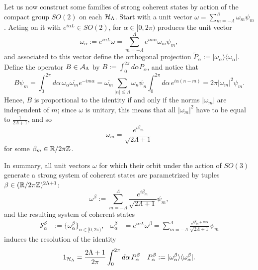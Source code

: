 Let us now construct some families of strong coherent states by action of the compact group $SO(2)$ on each $\mathcal H_\Lambda$. Start with a unit vector $\omega = \sum_{m = -\Lambda}^\Lambda \omega_m \psi_m$. Acting on it with $e^{i \alpha L } \in  SO(2)$, for $\alpha \in [0, 2\pi)$
produces the unit vector
\begin{equation}
    \omega_\alpha := e^{i \alpha L} \omega = \sum_{m = -\Lambda}^\Lambda e^{im\alpha} \omega_m \psi_m,
\end{equation}
and associated to this vector define the orthogonal projection
$\tilde P_\alpha := | \omega_\alpha \rangle \langle \omega_\alpha|$. Define the operator $B \in \mathcal A_{\Lambda}$ by $B := \int_0^{2\pi} d\alpha P_{\alpha}$, and notice that
\begin{equation*}
    B \psi_m = \int_{0}^{2\pi} d\alpha \, \omega_\alpha \overline{\omega_m} e^{-im\alpha} = \overline{\omega_m} \sum_{|n| \leq \Lambda} \omega_n \psi_n \int_0^{2\pi}d\alpha\, e^{i\alpha(n-m)} = 2 \pi |\omega_m|^2 \psi_m.
\end{equation*}
Hence, $B$ is proportional to the identity if and only if the norms $|\omega_m|$ are independent of $m$; since $\omega$ is unitary, this means that all $|\omega_m|^2$ have to be equal to $\frac{1}{2\Lambda + 1}$, and so
\begin{equation*}
    \omega_m = \frac{e^{i \beta_m}}{\sqrt{2\Lambda + 1}}
\end{equation*}
for some $\beta_m \in \mathbb{R}/2\pi \mathbb{Z}$. 

In summary, all unit vectors $\omega$ for which their orbit under the action of $SO(3)$ generate a strong system of coherent states are parametrized by tuples $\beta \in (\mathbb{R}/2\pi\mathbb{Z})^{2\Lambda + 1}$:
\begin{equation}
    \omega^\beta := \sum_{m = -\Lambda}^\Lambda \frac{e^{i \beta_m}}{\sqrt{2\Lambda + 1}} \psi_m,
\end{equation}
and the resulting system of coherent states
\begin{align}
    \mathcal S^\beta_\alpha &:= \{\omega_\alpha^\beta\}_{\alpha \in [0, 2\pi)}, & 
    \omega^\beta_\alpha &= e^{i\alpha L} \omega^\beta = \sum_{m = -\Lambda}^\Lambda \frac{e^{i \beta_m + m \alpha}}{\sqrt{2\Lambda + 1}} \psi_m
\end{align}
induces the resolution of the identity
\begin{align}
    1_{\mathcal H_\Lambda} &= \frac{2\Lambda + 1}{2\pi} \int_0^{2\pi} d\alpha \, P^\beta_\alpha &
    P_\alpha^\beta := |\omega^\beta_\alpha \rangle\langle \omega^\beta_\alpha|.
\end{align}

